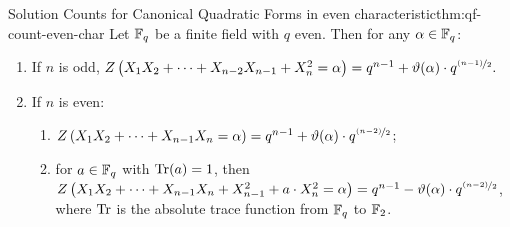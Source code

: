 \begin{Theorem}{Solution Counts for Canonical Quadratic Forms in even characteristic}{thm:qf-count-even-char}
  Let $\mathbb{F}_q$ be a finite field with $q$ even. Then for any $\alpha\in\mathbb{F}_q$:
  \begin{enumerate}[label=(\roman*)]
    \item If $n$ is odd, $Z\left(X_1X_2+\cdots + X_{n-2}X_{n-1}+X_n^2=\alpha\right)=q^{n-1}+\vartheta(\alpha)\cdot q^{\nicefrac{(n-1)}{2}}.$
    \item If $n$ is even:
    \begin{enumerate}[label=(\alph*)]
      \item $Z\left(X_1X_2+\cdots +X_{n-1}X_n=\alpha\right)=q^{n-1}+\vartheta(\alpha)\cdot q^{\nicefrac{(n-2)}{2}}$;
      \item for $a\in\mathbb{F}_q$ with $\operatorname{Tr}(a)=1$, then $Z\left(X_1X_2+\cdots+X_{n-1}X_{n}+X_{n-1}^2+a\cdot X_n^2=\alpha\right)=q^{n-1}-\vartheta(\alpha)\cdot q^{\nicefrac{(n-2)}{2}}$, where $\operatorname{Tr}$ is the absolute trace function from $\mathbb{F}_q$ to $\mathbb{F}_2$.
    \end{enumerate}
  \end{enumerate}
\end{Theorem}
